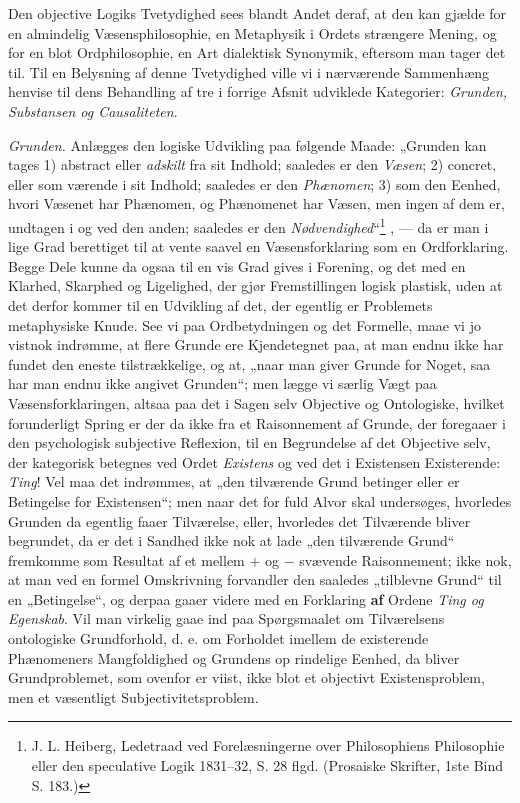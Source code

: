 \documentclass[11pt]{book}
\newcommand{\opage}[1]{\marginnote{\footnotesize\textit{[#1]}}}
\begin{document}
Den objective Logiks Tvetydighed sees blandt Andet deraf, at den kan
gjælde for en almindelig Væsensphilosophie, en Metaphysik i Ordets
strængere Mening, og for en blot Ordphilosophie, en Art dialektisk
Synonymik, eftersom man tager det til. Til en Belysning af denne
Tvetydighed ville vi i nærværende Sammenhæng henvise til dens Behandling
af tre i forrige Afsnit udviklede Kategorier: \emph{Grunden, Substansen og
Causaliteten}.

\emph{Grunden.} Anlægges den logiske Udvikling paa følgende Maade:
„Grunden kan tages 1) abstract eller \emph{adskilt} fra sit Indhold;
saaledes er den \emph{Væsen}; 2) concret, eller som værende i sit Indhold;
saaledes er den \emph{Phænomen}; 3) som den Eenhed, hvori Væsenet har
Phænomen, og Phænomenet
\opage{135} \setcounter{footnote}{0}%
har Væsen, men ingen af dem er, undtagen i og ved den anden; saaledes er
den \emph{Nødvendighed}“\footnote{J. L. Heiberg, Ledetraad ved
Forelæsningerne over Philosophiens Philosophie eller den speculative Logik
1831--32, S. 28 flgd. (Prosaiske Skrifter, 1ste Bind S. 183.)}%
, --- da er man i lige Grad berettiget til at vente saavel en
Væsensforklaring som en Ordforklaring. Begge Dele kunne da ogsaa til en
vis Grad gives i Forening, og det med en Klarhed, Skarphed og Ligelighed,
der gjør Fremstillingen logisk plastisk, uden at det derfor kommer til en
Udvikling af det, der egentlig er Problemets metaphysiske Knude. See vi
paa Ordbetydningen og det Formelle, maae vi jo vistnok indrømme, at flere
Grunde ere Kjendetegnet paa, at man endnu ikke har fundet den eneste
tilstrækkelige, og at, „naar man giver Grunde for Noget, saa har man endnu
ikke angivet Grunden“; men lægge vi særlig Vægt paa Væsensforklaringen,
altsaa paa det i Sagen selv Objective og Ontologiske, hvilket forunderligt
Spring er der da ikke fra et Raisonnement af Grunde, der foregaaer i den
psychologisk subjective Reflexion, til en Begrundelse af det Objective
selv, der kategorisk betegnes ved Ordet \emph{Existens} og ved det i
Existensen Existerende: \emph{Ting}! Vel maa det indrømmes, at „den
tilværende Grund betinger eller er Betingelse for Existensen“; men naar
det for fuld Alvor skal undersøges, hvorledes Grunden da egentlig faaer
Tilværelse, eller, hvorledes det Tilværende bliver begrundet, da er det i
Sandhed ikke nok at lade „den tilværende Grund“ fremkomme som Resultat af
et mellem $+$ og $-$ svævende Raisonnement; ikke nok, at man ved en formel
Omskrivning forvandler den saaledes „tilblevne Grund“ til en
„Betingelse“, og derpaa gaaer videre med en Forklaring \textbf{af} Ordene
\emph{Ting og Egenskab}.
Vil man virkelig gaae ind paa Spørgsmaalet om Tilværelsens ontologiske
Grundforhold, d. e. om Forholdet imellem de existerende Phænomeners
Mangfoldighed og Grundens op\-%
\opage{136} \setcounter{footnote}{0}%
rindelige Eenhed, da bliver Grundproblemet, som ovenfor er viist, ikke
blot et objectivt Existensproblem, men et væsentligt
Subjectivitetsproblem.
\end{document}
